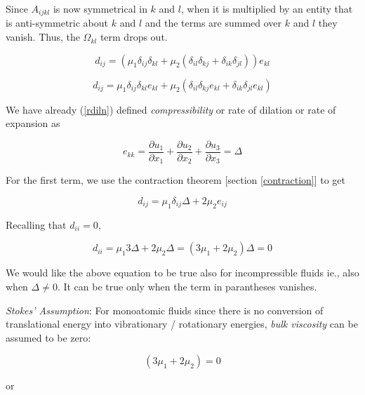 Since $A_{ijkl}$ is now symmetrical in $k$ and $l$, when it is multiplied by an entity that is anti-symmetric about $k$ and $l$ and the terms are summed over $k$ and $l$ they vanish. Thus, the $\Omega_{kl}$ term drops out.

\begin{equation}
d_{ij} = \left( \mu_1 \delta_{ij}\delta_{kl} + \mu_2 \left( \delta_{il}\delta_{kj} + \delta_{ik}\delta_{jl} \right) \right) e_{kl}
\end{equation} 

\begin{equation}
d_{ij} = \mu_1 \delta_{ij}\delta_{kl}e_{kl} + \mu_2 \left( \delta_{il}\delta_{kj}e_{kl} + \delta_{ik}\delta_{jl}e_{kl} \right)
\end{equation} 


We have already (\ref{rdiln}) defined {\em compressibility} or {rate of dilation} or rate of expansion as

\begin{equation}
e_{kk} = \frac{\partial u_1}{\partial x_1} + \frac{\partial u_2}{\partial x_2} + \frac{\partial u_3}{\partial x_3} = \Delta 
\end{equation} 

For the first term, we use the contraction theorem [section \ref{contraction}] to get

\begin{equation}
d_{ij} = \mu_1 \delta_{ij}\Delta + 2 \mu_2 e_{ij}
\end{equation} 

Recalling that $d_{ii}=0$,

\begin{equation}
d_{ii} = \mu_1 3 \Delta + 2 \mu_2 \Delta = (3 \mu_1 + 2 \mu_2) \Delta = 0
\end{equation} 

We would like the above equation to be true also for incompressible fluids ie., also when $\Delta \ne 0$. It can be true only when the term in parantheses vanishes.


{\em Stokes' Assumption}: For monoatomic fluids since there is no conversion of translational energy into vibrationary / rotationary energies, {\em bulk viscosity} can be assumed to be zero:

$$(3 \mu_1 + 2 \mu_2)=0$$ 

or


